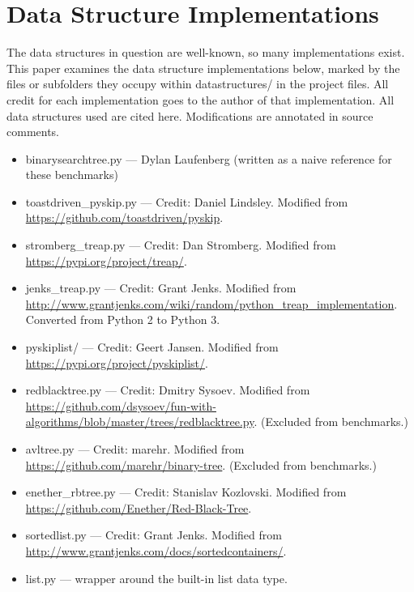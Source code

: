 \documentclass{article}
\begin{document}
\section{Data Structure Implementations}
The data structures in question are well-known, so many implementations exist. This paper examines the data structure implementations below, marked by the files or subfolders they occupy within datastructures/ in the project files. All credit for each implementation goes to the author of that implementation. All data structures used are cited here. Modifications are annotated in source comments.

\begin{itemize}
    \item binarysearchtree.py --- Dylan Laufenberg (written as a naive reference for these benchmarks)
    \item toastdriven\_pyskip.py --- Credit: Daniel Lindsley. Modified from \url{https://github.com/toastdriven/pyskip}.
    \item stromberg\_treap.py --- Credit: Dan Stromberg. Modified from \url{https://pypi.org/project/treap/}.
    \item jenks\_treap.py --- Credit: Grant Jenks. Modified from \url{http://www.grantjenks.com/wiki/random/python_treap_implementation}. Converted from Python 2 to Python 3.
    \item pyskiplist/ --- Credit: Geert Jansen. Modified from \url{https://pypi.org/project/pyskiplist/}.
    \item redblacktree.py --- Credit: Dmitry Sysoev. Modified from \url{https://github.com/dsysoev/fun-with-algorithms/blob/master/trees/redblacktree.py}. (Excluded from benchmarks.)
    \item avltree.py --- Credit: marehr. Modified from \url{https://github.com/marehr/binary-tree}. (Excluded from benchmarks.)
    \item enether\_rbtree.py --- Credit: Stanislav Kozlovski. Modified from \url{https://github.com/Enether/Red-Black-Tree}.
    \item sortedlist.py --- Credit: Grant Jenks. Modified from \url{http://www.grantjenks.com/docs/sortedcontainers/}.
    \item list.py --- wrapper around the built-in list data type.
\end{itemize}
\end{document}
